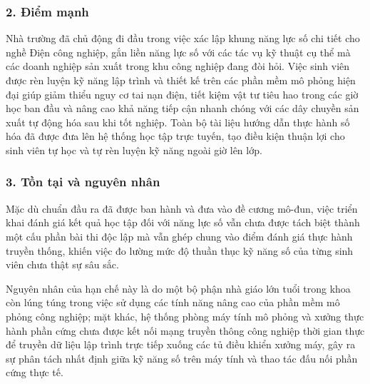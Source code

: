 \subsubsection*{2. Điểm mạnh}
Nhà trường đã chủ động đi đầu trong việc xác lập khung năng lực số chi tiết cho nghề Điện công nghiệp, gắn liền năng lực số với các tác vụ kỹ thuật cụ thể mà các doanh nghiệp sản xuất trong khu công nghiệp đang đòi hỏi. Việc sinh viên được rèn luyện kỹ năng lập trình và thiết kế trên các phần mềm mô phỏng hiện đại giúp giảm thiểu nguy cơ tai nạn điện, tiết kiệm vật tư tiêu hao trong các giờ học ban đầu và nâng cao khả năng tiếp cận nhanh chóng với các dây chuyền sản xuất tự động hóa sau khi tốt nghiệp. Toàn bộ tài liệu hướng dẫn thực hành số hóa đã được đưa lên hệ thống học tập trực tuyến, tạo điều kiện thuận lợi cho sinh viên tự học và tự rèn luyện kỹ năng ngoài giờ lên lớp.

\subsubsection*{3. Tồn tại và nguyên nhân}
Mặc dù chuẩn đầu ra đã được ban hành và đưa vào đề cương mô-đun, việc triển khai đánh giá kết quả học tập đối với năng lực số vẫn chưa được tách biệt thành một cấu phần bài thi độc lập mà vẫn ghép chung vào điểm đánh giá thực hành truyền thống, khiến việc đo lường mức độ thuần thục kỹ năng số của từng sinh viên chưa thật sự sâu sắc. 

Nguyên nhân của hạn chế này là do một bộ phận nhà giáo lớn tuổi trong khoa còn lúng túng trong việc sử dụng các tính năng nâng cao của phần mềm mô phỏng công nghiệp; mặt khác, hệ thống phòng máy tính mô phỏng và xưởng thực hành phần cứng chưa được kết nối mạng truyền thông công nghiệp thời gian thực để truyền dữ liệu lập trình trực tiếp xuống các tủ điều khiển xưởng máy, gây ra sự phân tách nhất định giữa kỹ năng số trên máy tính và thao tác đấu nối phần cứng thực tế.

